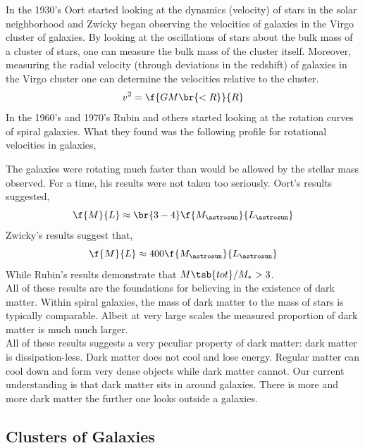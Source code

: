 \documentclass{article}
\begin{document}
In the 1930's Oort started looking at the dynamics (velocity) of stars in the solar neighborhood and Zwicky began observing the velocities of galaxies in the Virgo cluster of galaxies. By looking at the oscillations of stars about the bulk mass of a cluster of stars, one can measure the bulk mass of the cluster itself. Moreover, measuring the radial velocity (through deviations in the redshift) of galaxies in the Virgo cluster one can determine the velocities relative to the cluster.
\[ v^2 = \f{G M\br{< R}}{R} \]
In the 1960's and 1970's Rubin and others started looking at the rotation curves of spiral galaxies. What they found was the following profile for rotational velocities in galaxies,
\begin{center}
\end{center}
The galaxies were rotating much faster than would be allowed by the stellar mass observed. For a time, his results were not taken too seriously.
Oort's results suggested,
\[ \f{M}{L} \approx \br{3-4} \f{M_{\astrosun}}{L_{\astrosun}} \]
Zwicky's results suggest that,
\[ \f{M}{L} \approx 400 \f{M_{\astrosun}}{L_{\astrosun}} \]
While Rubin's results demonstrate that ${M\tsb{tot}}/{M_{*}} > 3$. \\

All of these results are the foundations for believing in the existence of dark matter. Within spiral galaxies, the mass of dark matter to the mass of stars is typically comparable. Albeit at very large scales the measured proportion of dark matter is much much larger. \\

All of these results suggests a very peculiar property of dark matter: dark matter is dissipation-less. Dark matter does not cool and lose energy. Regular matter can cool down and form very dense objects while dark matter cannot. Our current understanding is that dark matter sits in  around galaxies. There is more and more dark matter the further one looks outside a galaxies.

\subsection{Clusters of Galaxies}
\end{document}
